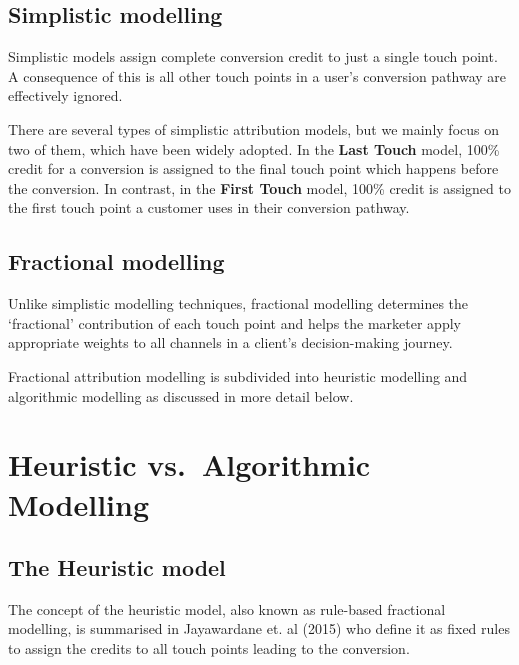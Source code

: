\documentclass[]{book}
\begin{document}
\hypertarget{simplistic-modelling}{%
\subsection{Simplistic modelling}\label{simplistic-modelling}}

Simplistic models assign complete conversion credit to just a single touch
point. A consequence of this is all other touch points in a user's conversion
pathway are effectively ignored.

There are several types of simplistic attribution models, but we mainly focus on
two of them, which have been widely adopted. In the \textbf{Last Touch} model,
100\% credit for a conversion is assigned to the final touch point which happens
before the conversion. In contrast, in the \textbf{First Touch} model, 100\% credit
is assigned to the first touch point a customer uses in their conversion pathway.

\hypertarget{fractional-modelling}{%
\subsection{Fractional modelling}\label{fractional-modelling}}

Unlike simplistic modelling techniques, fractional modelling determines the
`fractional' contribution of each touch point and helps the marketer apply
appropriate weights to all channels in a client's decision-making journey.

Fractional attribution modelling is subdivided into heuristic modelling and
algorithmic modelling as discussed in more detail below.

\hypertarget{heuristic-vs.algorithmic-modelling}{%
\section{Heuristic vs.~Algorithmic Modelling}\label{heuristic-vs.algorithmic-modelling}}

\hypertarget{the-heuristic-model}{%
\subsection{The Heuristic model}\label{the-heuristic-model}}

The concept of the heuristic model, also known as rule-based fractional modelling,
is summarised in Jayawardane et. al (2015) who define it as fixed rules to
assign the credits to all touch points leading to the conversion.
\end{document}
